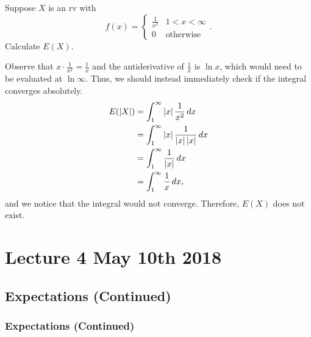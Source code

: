 \documentclass[notoc,notitlepage]{tufte-book}
\begin{document}
\begin{eg}[Example 2.18]
  Suppose $X$ is an rv with
  \begin{equation*}
    f(x) = \begin{cases}
      \frac{1}{x^2} & 1 < x < \infty \\
      0             & \text{otherwise}
    \end{cases}.
  \end{equation*}
  Calculate $E(X)$.

  \begin{solution}
    Observe that $x \cdot \frac{1}{x^2} = \frac{1}{x}$ and the antiderivative of $\frac{1}{x}$ is $\ln x$, which would need to be evaluated at $\ln \infty$. Thus, we should instead immediately check if the integral converges absolutely.
    \begin{align*}
      E(\left|X\right|) &= \int_{1}^{\infty} \left|x\right| \frac{1}{x^2} \mathop{}\!d{x} \\
                 &= \int_{1}^{\infty} \left|x\right| \frac{1}{\left|x\right| \left|x\right|} \mathop{}\!d{x} \\
                 &= \int_{1}^{\infty} \frac{1}{\left|x\right|} \mathop{}\!d{x} \\
                 &= \int_{1}^{\infty} \frac{1}{x} \mathop{}\!d{x},
    \end{align*}
    and we notice that the integral would not converge. Therefore, $E(X)$ does not exist.
  \end{solution}
\end{eg}




\chapter{Lecture 4 May 10th 2018}%
\label{chp:lecture_4_may_10th_2018}

\section{Expectations (Continued)}%
\label{sec:expectations_continued}

\subsection{Expectations (Continued)}%
\label{sub:expectations_continued}
\end{document}
